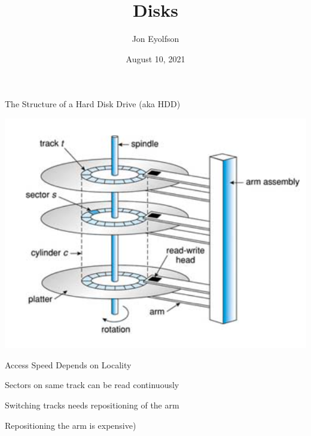 

\title{Disks}
\author{Jon Eyolfson}
\date{August 10, 2021}


  \begin{frame}
    \titlepage
  \end{frame}

  \begin{frame}{The Structure of a Hard Disk Drive (aka HDD)}
    \begin{center}
        \includegraphics[height=0.8\textheight]{hdd1.png}
    \end{center}
  \end{frame}

  \begin{frame}{Access Speed Depends on Locality}

    Sectors on same track can be read continuously

    \vspace{2em}

    Switching tracks needs repositioning of the arm

    \hspace{2em} Repositioning the arm is expensive)
  \end{frame}

